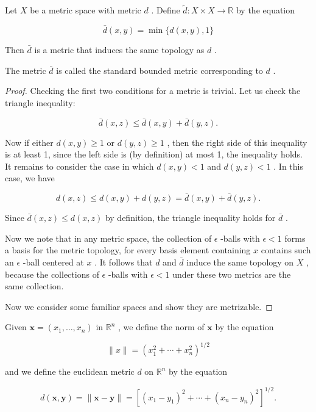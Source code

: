 \begin{theorem} Let \(X\) be a metric space with metric \(d\) . Define \(\widetilde{d} : X \times  X \rightarrow  \mathbb{R}\) by the equation

\[
\bar{d}\left( {x,y}\right)  = \min \{ d\left( {x,y}\right) ,1\}
\]

Then \(\bar{d}\) is a metric that induces the same topology as \(d\) .

The metric \(\bar{d}\) is called the standard bounded metric corresponding to \(d\) .

\end{theorem}
\begin{proof}
Checking the first two conditions for a metric is trivial. Let us check the triangle inequality:

\[
\bar{d}\left( {x,z}\right)  \leq  \bar{d}\left( {x,y}\right)  + \bar{d}\left( {y,z}\right) .
\]

Now if either \(d\left( {x,y}\right)  \geq  1\) or \(d\left( {y,z}\right)  \geq  1\) , then the right side of this inequality is at least 1, since the left side is (by definition) at most 1, the inequality holds. It remains to consider the case in which \(d\left( {x,y}\right)  < 1\) and \(d\left( {y,z}\right)  < 1\) . In this case, we have

\[
d\left( {x,z}\right)  \leq  d\left( {x,y}\right)  + d\left( {y,z}\right)  = \bar{d}\left( {x,y}\right)  + \bar{d}\left( {y,z}\right) .
\]

Since \(\bar{d}\left( {x,z}\right)  \leq  d\left( {x,z}\right)\) by definition, the triangle inequality holds for \(\bar{d}\) .

Now we note that in any metric space, the collection of \(\epsilon\) -balls with \(\epsilon  < 1\) forms a basis for the metric topology, for every basis element containing \(x\) contains such an \(\epsilon\) -ball centered at \(x\) . It follows that \(d\) and \(\bar{d}\) induce the same topology on \(X\) , because the collections of \(\epsilon\) -balls with \(\epsilon  < 1\) under these two metrics are the same collection.

Now we consider some familiar spaces and show they are metrizable.
\end{proof}

\begin{definition} Given \(\mathbf{x} = \left( {{x}_{1},\ldots ,{x}_{n}}\right)\) in \({\mathbb{R}}^{n}\) , we define the norm of \(\mathbf{x}\) by the equation

\[
\parallel x\parallel  = {\left( {x}_{1}^{2} + \cdots  + {x}_{n}^{2}\right) }^{1/2}
\]

and we define the euclidean metric \(d\) on \({\mathbb{R}}^{n}\) by the equation

\[
d\left( {\mathbf{x},\mathbf{y}}\right)  = \parallel \mathbf{x} - \mathbf{y}\parallel  = {\left\lbrack  {\left( {x}_{1} - {y}_{1}\right) }^{2} + \cdots  + {\left( {x}_{n} - {y}_{n}\right) }^{2}\right\rbrack  }^{1/2}.
\]
\end{definition}

